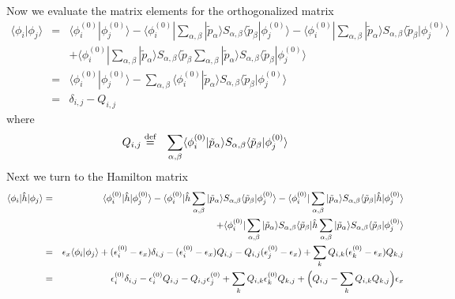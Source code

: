 \documentclass[11pt,a4paper]{report}
\begin{document}
Now we evaluate the matrix elements for the orthogonalized matrix
\begin{eqnarray}
\langle\phi_i|\phi_j\rangle&=&
\langle\phi_i^{(0)}|\phi_j^{(0)}\rangle
-\langle\phi_i^{(0)}|\sum_{\alpha,\beta}|\tilde{p}_\alpha\rangle
S_{\alpha,\beta}\langle\tilde{p}_\beta|\phi_j^{(0)}\rangle
-\langle\phi_i^{(0)}|\sum_{\alpha,\beta}|\tilde{p}_\alpha\rangle S_{\alpha,\beta}\langle\tilde{p}_\beta|\phi_j^{(0)}\rangle
\nonumber\\
&&+
\langle\phi_i^{(0)}|\sum_{\alpha,\beta}|\tilde{p}_\alpha\rangle S_{\alpha,\beta}\langle\tilde{p}_\beta\sum_{\alpha,\beta}|\tilde{p}_\alpha\rangle S_{\alpha,\beta}\langle\tilde{p}_\beta|\phi_j^{(0)}\rangle
\nonumber\\
&=&
\langle\phi_i^{(0)}|\phi_j^{(0)}\rangle
-\sum_{\alpha,\beta}\langle\phi_i^{(0)}|\tilde{p}_\alpha\rangle
S_{\alpha,\beta}\langle\tilde{p}_\beta|\phi_j^{(0)}\rangle
\nonumber\\
&=&
\delta_{i,j}-Q_{i,j}
\end{eqnarray}
where
\begin{eqnarray}
Q_{i,j}&\stackrel{\text{def}}{=}&\sum_{\alpha,\beta}\langle\phi_i^{(0)}|\tilde{p}_\alpha\rangle
S_{\alpha,\beta}\langle\tilde{p}_\beta|\phi_j^{(0)}\rangle
\end{eqnarray}
%
Next we turn to the Hamilton matrix
\begin{eqnarray}
\langle\phi_i|\hat{h}|\phi_j\rangle
&=&
\langle\phi_i^{(0)}|\hat{h}|\phi_j^{(0)}\rangle
-\langle\phi_i^{(0)}|\hat{h}\sum_{\alpha,\beta}|\tilde{p}_\alpha\rangle
S_{\alpha,\beta}\langle\tilde{p}_\beta|\phi_j^{(0)}\rangle
-\langle\phi_i^{(0)}|\sum_{\alpha,\beta}|\tilde{p}_\alpha\rangle S_{\alpha,\beta}\langle\tilde{p}_\beta|\hat{h}|\phi_j^{(0)}\rangle
\nonumber\\
&&+
\langle\phi_i^{(0)}|\sum_{\alpha,\beta}|\tilde{p}_\alpha\rangle S_{\alpha,\beta}\langle\tilde{p}_\beta|\hat{h}\sum_{\alpha,\beta}|\tilde{p}_\alpha\rangle S_{\alpha,\beta}\langle\tilde{p}_\beta|\phi_j^{(0)}\rangle
\nonumber\\
&=&\epsilon_x\langle\phi_i|\phi_j\rangle
+(\epsilon_i^{(0)}-\epsilon_x)\delta_{i,j}
-(\epsilon_i^{(0)}-\epsilon_x)Q_{i,j}
-Q_{i,j}(\epsilon_j^{(0)}-\epsilon_x)
+\sum_k Q_{i,k}(\epsilon_k^{(0)}-\epsilon_x)Q_{k,j}
\nonumber\\
&=&
\epsilon_i^{(0)}\delta_{i,j}
-\epsilon_i^{(0)}Q_{i,j}
-Q_{i,j}\epsilon_j^{(0)}
+\sum_k Q_{i,k}\epsilon_k^{(0)}Q_{k,j}
+\Bigl(Q_{i,j}-\sum_k Q_{i,k}Q_{k,j}\Bigr)
\epsilon_x
\end{eqnarray}

\printindex


\end{document}
